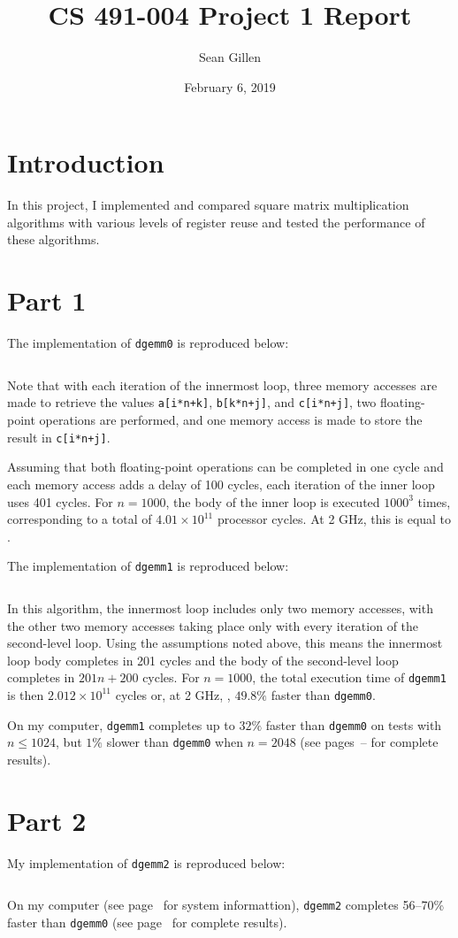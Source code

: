 \documentclass[12pt,letterpaper,oneside]{article}
\begin{document}
\title{CS 491-004 Project 1 Report}
\author{Sean Gillen}
\date{February 6, 2019}
\maketitle

\section*{Introduction}
In this project, I implemented and compared square matrix multiplication algorithms with
various levels of register reuse and tested the performance of these algorithms.

\section*{Part 1}
The implementation of \texttt{dgemm0} is reproduced below:
\inputminted{c}{dgemm0.c}
Note that with each iteration of the innermost loop, three memory accesses are made to retrieve the values
\texttt{a[i*n+k]}, \texttt{b[k*n+j]}, and \texttt{c[i*n+j]}, two floating-point operations are performed, and 
one memory access is made to store the result in \texttt{c[i*n+j]}.

Assuming that both floating-point operations can be completed in one cycle and each memory access adds a delay
of 100 cycles, each iteration of the inner loop uses 401 cycles. For $n=1000$, the body of the inner loop
is executed $1000^3$ times, corresponding to a total of $4.01\times10^{11}$ processor cycles. 
At 2 GHz, this is equal to .

The implementation of \texttt{dgemm1} is reproduced below:
\inputminted{c}{dgemm1.c}
In this algorithm, the innermost loop includes only two memory accesses, with the other two memory accesses taking
place only with every iteration of the second-level loop. Using the assumptions noted above, this means the innermost loop body completes in 201 cycles
and the body of the second-level loop completes in $201n+200$ cycles. For $n=1000$, the total execution time
of \texttt{dgemm1} is then $2.012\times10^{11}$ cycles or, at 2 GHz, , $49.8\%$ faster than \texttt{dgemm0}.

On my computer, \texttt{dgemm1} completes up to $32\%$ faster than \texttt{dgemm0} 
on tests with $n\le1024$, but $1\%$ slower than \texttt{dgemm0} when $n=2048$ 
(see pages~\pageref{results0}--\pageref{results1} for complete results).

\section*{Part 2}
My implementation of \texttt{dgemm2} is reproduced below:
\inputminted{c}{dgemm2.c}
On my computer (see page~\pageref{specs} for system informattion), \texttt{dgemm2} completes 56--70\% faster than \texttt{dgemm0} 
(see page~\pageref{results2} for complete results).
\end{document}
